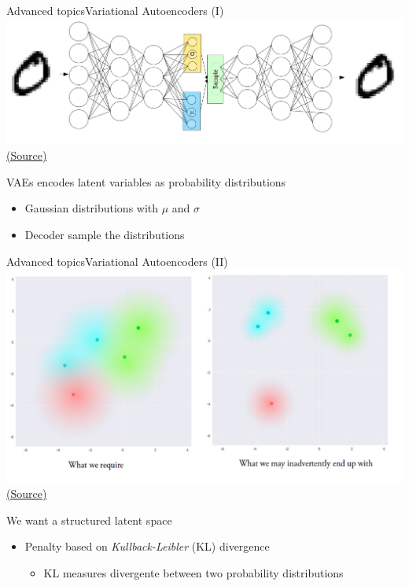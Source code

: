 \documentclass[10pt,compress]{beamer} %
\begin{document}
\begin{frame}{Advanced topics}{Variational Autoencoders (I)}
	\centering\includegraphics[width=0.85\linewidth]{figs/vae.png}\\
	\scriptsize\href{https://towardsdatascience.com/intuitively-understanding-variational-autoencoders-1bfe67eb5daf}{(Source)}

	\bigskip

	\flushleft
	\normalsize

	VAEs encodes latent variables as probability distributions
	\begin{itemize}
		\item Gaussian distributions with $\mu$ and $\sigma$
		\item Decoder sample the distributions
	\end{itemize}
\end{frame}

\begin{frame}{Advanced topics}{Variational Autoencoders (II)}
	\centering\includegraphics[width=0.6\linewidth]{figs/vae-kl.png}\\
	\scriptsize\href{https://towardsdatascience.com/intuitively-understanding-variational-autoencoders-1bfe67eb5daf}{(Source)}

	\smallskip

	\flushleft
	\normalsize

	We want a structured latent space
	\begin{itemize}
		\item Penalty based on \textit{Kullback-Leibler} (KL) divergence
			\begin{itemize}
				\item KL measures divergente between two probability distributions
			\end{itemize}
	\end{itemize}
\end{frame}
\end{document}
